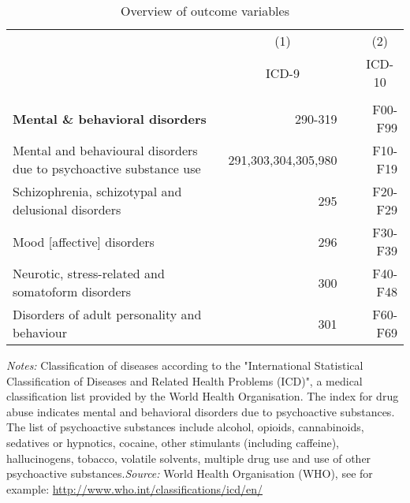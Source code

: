 \documentclass{scrartcl} %
\begin{document}
\begin{table}[h] %
\begin{threeparttable}
\centering %
\caption{Overview of outcome variables} %
\label{tab:outcomes_coding_main_chapters} 
\begin{tabular}{lrrr} %
\toprule %
        &\multicolumn{1}{c}{(1)}& &\multicolumn{1}{c}{(2)}\\
&\multicolumn{1}{c}{ICD-9} & & \multicolumn{1}{c}{ICD-10} \\ 
\midrule
\\
			\textbf{Mental \& behavioral  disorders}                             	&	290-319		& &		F00-F99 \\
\hspace{4pt} Mental and behavioural disorders due to psychoactive substance use & 291,303,304,305,980& & 	F10-F19 \\ 
\hspace{4pt} Schizophrenia, schizotypal and delusional disorders			& 295			& & 	F20-F29 \\
\hspace{4pt} Mood [affective] disorders										& 296			& & 	F30-F39 \\
\hspace{4pt} Neurotic, stress-related and somatoform disorders				& 300			& & 	F40-F48 \\
\hspace{4pt} Disorders of adult personality and behaviour 					& 301			& & 	F60-F69 \\		
\bottomrule %
\end{tabular}
\begin{tablenotes}
      \scriptsize{ \item \textit{Notes:} Classification of diseases according to the "International Statistical Classification of Diseases and Related Health Problems (ICD)", a medical classification list provided by the World Health Organisation. The index for drug abuse indicates mental and behavioral disorders due to psychoactive substances. The list of psychoactive substances include alcohol, opioids, cannabinoids, sedatives or hypnotics, cocaine, other stimulants (including caffeine), hallucinogens, tobacco, volatile solvents,  multiple drug use and use of other psychoactive substances.\newline \textit{Source:} World Health Organisation (WHO), see for example: \href{http://www.who.int/classifications/icd/en/}{http://www.who.int/classifications/icd/en/} }
    \end{tablenotes}
  \end{threeparttable}
\end{table}
\end{document}
